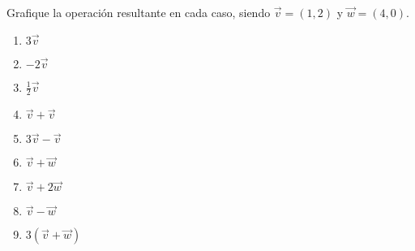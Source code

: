 Grafique la operaci\'on resultante en cada caso, siendo $\vec v=(1,2)$ y $\vec w=(4,0)$.
\begin{enumerate}
  \item $3\vec v$
  \item $-2\vec v$
  \item $\frac12\vec v$
  \item $\vec v + \vec v$
  \item $3\vec v - \vec v$
  \item $\vec v + \vec w$
  \item $\vec v + 2\vec w$
  \item $\vec v - \vec w$
  \item $3 ( \vec v + \vec w )$
\end{enumerate}
